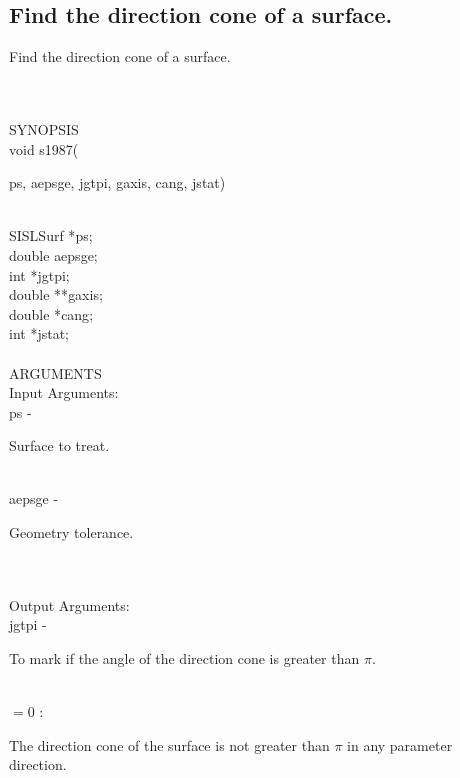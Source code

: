 \subsection{Find the direction cone of a surface.}
\begin{minipg1}
  Find the direction cone of a surface.
\end{minipg1} \\ \\
SYNOPSIS\\
        \>void s1987(\begin{minipg3}
          {\fov ps}, {\fov aepsge}, {\fov jgtpi}, {\fov gaxis}, {\fov cang}, {\fov jstat})
        \end{minipg3}\\[0.ex]
        \>\>    SISLSurf \> *{\fov ps};\\
        \>\>    double   \> {\fov aepsge};\\
        \>\>    int      \> *{\fov jgtpi};\\
        \>\>    double   \> **{\fov gaxis};\\
        \>\>    double   \> *{\fov cang};\\
        \>\>    int      \> *{\fov jstat};\\
\\
ARGUMENTS\\
        \>Input Arguments:\\
        \>\>    {\fov ps}\> - \>  \begin{minipg2}
                     Surface to treat.
                               \end{minipg2}\\
        \>\>    {\fov aepsge}\> - \>  \begin{minipg2}
                     Geometry tolerance.
                               \end{minipg2}\\
\\
        \>Output Arguments:\\
        \>\>    {\fov jgtpi}\> - \>
        \begin{minipg2}
          To mark if the angle of the direction cone is
          greater than $\pi$.
        \end{minipg2}\\[0.8ex]
                \>\>\>\> $=0$ \> :
                \begin{minipg5}
                  The direction cone of the surface
                  is not greater than $\pi$ in any parameter direction.
                \end{minipg5}\\[0.8ex]
